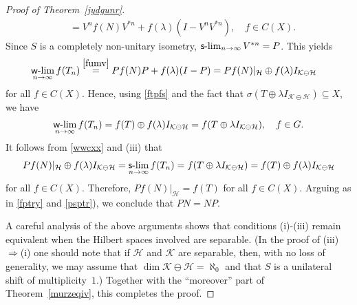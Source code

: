 \documentclass[reqno]{amsproc}
\numberwithin{equation}{section}
\theoremstyle{remark}
\newcommand*{\hh}{\mathcal{H}}
\newcommand*{\kk}{\mathcal{K}}
\theoremstyle{definition}
\def\sslim{\qopname\relax m{{\sf{s}\textrm-}lim}}
\def\wwlim{\qopname\relax m{{\sf{w}\textrm-}lim}}
\begin{document}
\begin{proof}[Proof of Theorem~\ref{jydgunr}]
\begin{align}
&= V^n f(N) V^{*n} + f(\lambda) (I-V^n V^{*n}), \quad
f \in C(X).
   \end{align}
Since $S$ is a completely non-unitary isometry,
$\sslim_{n\to\infty}V^{*n} = P$. This yields
   \begin{align}     \label{wwcxx}
\wwlim_{n\to\infty} f(T_n) & \overset{\eqref{fumv}}= P
f(N)P + f(\lambda) (I-P) = P f(N)|_{\hh} \oplus
f(\lambda) I_{\kk\ominus \hh}
   \end{align}
for all $f\in C(X)$. Hence, using \eqref{ftpfs} and
the fact that $\sigma(T \oplus \lambda I_{\kk\ominus
\hh})\subseteq X$, we have
   \begin{align} \label{wwcyz}
\wwlim_{n\to\infty} f(T_n) = f(T)\oplus f(\lambda)
I_{\kk\ominus \hh} = f(T \oplus \lambda I_{\kk\ominus
\hh}), \quad f\in G.
   \end{align}
It follows from \eqref{wwcxx} and (iii) that
   \begin{align*}
Pf(N)|_{\hh} \oplus f(\lambda) I_{\kk\ominus \hh}
=\sslim_{n\to\infty} f(T_n) = f(T \oplus \lambda
I_{\kk\ominus \hh}) = f(T) \oplus f(\lambda)
I_{\kk\ominus \hh}
   \end{align*}
for all $f\in C(X)$. Therefore, $Pf(N)|_{\hh}=f(T)$
for all $f\in C(X)$. Arguing as in \eqref{fptry} and
\eqref{psptr}), we conclude that $PN=NP$.

A careful analysis of the above arguments shows that
conditions (i)-(iii) remain equivalent when the
Hilbert spaces involved are separable. (In the proof
of (iii)$\Rightarrow$(i) one should note that if $\hh$
and $\kk$ are separable, then, with no loss of
generality, we may assume that $\dim \kk \ominus
\hh=\aleph_0$ and that $S$ is a unilateral shift of
multiplicity~$1$.) Together with the ``moreover'' part
of Theorem~\ref{murzeqiv}, this completes the proof.
   \end{proof}
\end{document}
